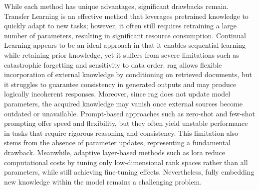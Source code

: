 \documentclass[a4paper,fleqn]{cas-sc}
\begin{document}
While each method has unique advantages, significant drawbacks remain.
Transfer Learning is an effective method that leverages pretrained knowledge to quickly adapt to new tasks; however, it often still requires retraining a large number of parameters, resulting in significant resource consumption.
Continual Learning appears to be an ideal approach in that it enables sequential learning while retaining prior knowledge, yet it suffers from severe limitations such as catastrophic forgetting and sensitivity to data order.
\gls{rag} allows flexible incorporation of external knowledge by conditioning on retrieved documents, but it struggles to guarantee consistency in generated outputs and may produce logically incoherent responses. Moreover, since \gls{rag} does not update model parameters, the acquired knowledge may vanish once external sources become outdated or unavailable.
Prompt-based approaches such as zero-shot and few-shot prompting offer speed and flexibility, but they often yield unstable performance in tasks that require rigorous reasoning and consistency. This limitation also stems from the absence of parameter updates, representing a fundamental drawback.
Meanwhile, adaptive layer-based methods such as \gls{lora} reduce computational costs by tuning only low-dimensional rank spaces rather than all parameters, while still achieving fine-tuning effects. Nevertheless, fully embedding new knowledge within the model remains a challenging problem.
\end{document}
